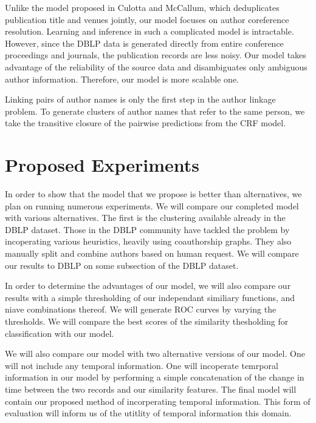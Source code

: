 \documentclass[twocolumn,letterpaper]{article}
\begin{document}
Unlike the model proposed in Culotta and
McCallum\cite{Culotta05aconditional}, which deduplicates publication
title and venues jointly, our model focuses on author coreference
resolution.  Learning and inference in such a complicated model is
intractable.  However, since the DBLP data is generated directly from
entire conference proceedings and journals, the publication records
are less noisy.  Our model takes advantage of the
reliability of the source data and disambiguates only ambiguous author
information.  Therefore, our model is more scalable one.

Linking pairs of author names is only the first step in the author
linkage problem.  To generate clusters of author names that refer to
the same person, we take the transitive closure of the pairwise
predictions from the CRF model.

\section{Proposed Experiments} %
\label{sec:proposed_experiments}
In order to show that the model that we propose is better than alternatives, we plan on running numerous experiments. We will compare our completed model with various alternatives. The first is the clustering available already in the DBLP dataset. Those in the DBLP community have tackled the problem by incoperating various heuristics, heavily using coauthorship graphs. They also manually split and combine authors based on human request. We will compare our results to DBLP on some subsection of the DBLP dataset. 

In order to determine the advantages of our model, we will also compare our results with a simple thresholding of our independant similiary functions, and niave combinations thereof. We will generate ROC curves by varying the thresholds. We will compare the best scores of the similarity thesholding for classification with our model.

We will also compare our model with two alternative versions of our model. One will not include any temporal information. One will incoperate temrporal information in our model by performing a simple concatenation of the change in time between the two records and our similarity features. The final model will contain our proposed method of incorperating temporal information. This form of evaluation will inform us of the utitlity of temporal information this domain.
\end{document}
